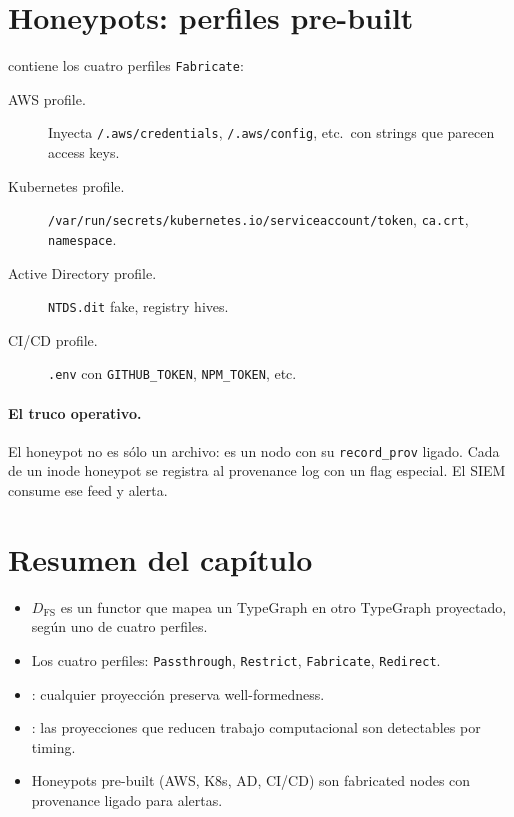 \section{Honeypots: perfiles pre-built}

 contiene los cuatro
perfiles \texttt{Fabricate}:

\begin{description}
  \item[AWS profile.] Inyecta \texttt{/.aws/credentials},
    \texttt{/.aws/config}, etc.\ con strings que parecen access keys.
  \item[Kubernetes profile.] \texttt{/var/run/secrets/kubernetes.io/serviceaccount/token},
    \texttt{ca.crt}, \texttt{namespace}.
  \item[Active Directory profile.] \texttt{NTDS.dit} fake, registry
    hives.
  \item[CI/CD profile.] \texttt{.env} con \texttt{GITHUB\_TOKEN},
    \texttt{NPM\_TOKEN}, etc.
\end{description}

\paragraph{El truco operativo.} El honeypot no es sólo un archivo: es
un nodo con su \texttt{record\_prov} ligado. Cada \opread{} de un
inode honeypot se registra al provenance log con un flag especial. El
SIEM consume ese feed y alerta.

\section*{Resumen del capítulo}

\begin{itemize}
  \item $D_{\mathrm{FS}}$ es un functor que mapea un TypeGraph en otro
    TypeGraph proyectado, según uno de cuatro perfiles.
  \item Los cuatro perfiles: \texttt{Passthrough}, \texttt{Restrict},
    \texttt{Fabricate}, \texttt{Redirect}.
  \item {}: cualquier proyección preserva
    well-formedness.
  \item {}: las proyecciones que reducen
    trabajo computacional son detectables por timing.
  \item Honeypots pre-built (AWS, K8s, AD, CI/CD) son fabricated nodes
    con provenance ligado para alertas.
\end{itemize}

